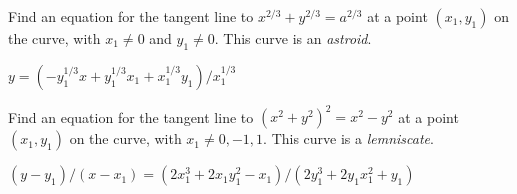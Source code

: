 \begin{exercises}
\begin{exercise} Find an equation for the tangent line to $x^{2/3} +
y^{2/3} = a^{2/3}$ at a point $(x_1 ,y_1)$ on the curve, 
with $x_1 \neq 0$ and $y_1 \neq 0$. This curve is an \textit{astroid}.
\begin{answer} $y=(-y_1^{1/3}x+y_1^{1/3}x_1+x_1^{1/3}y_1)/x_1^{1/3}$
\end{answer}\end{exercise}

\begin{exercise} Find an equation for the tangent line to $(x^2 +y^2 )^2 =x^2
-y^2$ at a point $(x_1 , y_1)$ on the curve, with $x_1 \neq 0, -1, 1$.
This curve is a \textit{lemniscate}.
\begin{answer} $(y-y_1)/(x-x_1)=(2x_1^3+2x_1y_1^2-x_1)/(2y_1^3+2y_1x_1^2+y_1)$
\end{answer}\end{exercise}


\end{exercises}







